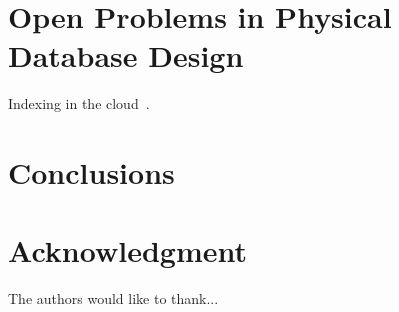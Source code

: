 \documentclass[12pt,a4paper]{article}
\begin{document}
\section{Open Problems in Physical Database Design}
\label{SEC-OPEN}

Indexing in the cloud~\cite{wang2010indexing}.

\section{Conclusions}
\label{SEC-CONCL}

\section*{Acknowledgment}


The authors would like to thank...



%








\end{document}

